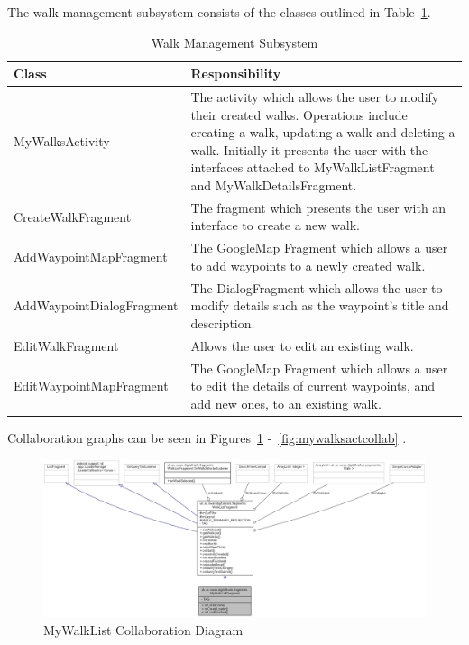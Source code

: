 \documentclass[11pt,a4paper]{report}
\begin{document}
The walk management subsystem consists of the classes outlined in Table~\ref{tab:walkcreate}.

\begin{longtable}{|p{5cm}|p{10cm}|}
\hline \caption{Walk Management Subsystem - Cont. on Next Page.} \endfoot
\hline \caption{Walk Management Subsystem} \label{tab:walkcreate} \endlastfoot
\hline
\textbf{Class} & \textbf{Responsibility} \\ \hline
MyWalksActivity & The activity which allows the user to modify their created walks. Operations include creating a walk, updating a walk and deleting a walk. Initially it presents the user with the interfaces attached to MyWalkListFragment and MyWalkDetailsFragment. \\ \hline
CreateWalkFragment & The fragment which presents the user with an interface to create a new walk. \\ \hline
AddWaypointMapFragment & The GoogleMap Fragment which allows a user to add waypoints to a newly created walk. \\ \hline
AddWaypointDialogFragment & The DialogFragment which allows the user to modify details such as the waypoint's title and description. \\ \hline
EditWalkFragment & Allows the user to edit an existing walk. \\ \hline
EditWaypointMapFragment & The GoogleMap Fragment which allows a user to edit the details of current waypoints, and add new ones, to an existing walk. \\ \hline
\end{longtable}

Collaboration graphs can be seen in Figures~\ref{fig:mywalklistcollab} -~\ref{fig:mywalksactcollab} .
\begin{figure}[H]
    \centering
    \includegraphics[width=0.8\textheight, angle=90]{mywalklistcollab}
    \caption{MyWalkList Collaboration Diagram}
    \label{fig:mywalklistcollab}
\end{figure}
\end{document}
